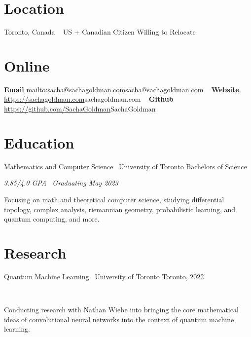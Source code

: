 \documentclass[]{style}
\begin{document}

\begin{aside} %
\section{Location}
Toronto, Canada
~ \vspace{-2mm}
US + Canadian Citizen 
Willing to Relocate
\section{Online}
\textbf{Email}
\url{mailto:sacha@sachagoldman.com}{sacha@sachagoldman.com} 
~ \vspace{-2mm}
\textbf{Website} 
\url{https://sachagoldman.com}{sachagoldman.com} 
~ \vspace{-2mm}
\textbf{Github}
\url{https://github.com/SachaGoldman}{SachaGoldman}
\end{aside}

\section{Education}

\begin{entrylist}

\entry
{Mathematics and Computer Science \ {\normalfont University of Toronto}}
{Bachelors of Science}
{\emph{3.85/4.0 GPA \ Graduating May 2023}
~ \vspace{1mm}

Focusing on math and theoretical computer science, studying differential topology, complex analysis, riemannian geometry, probabilistic learning, and quantum computing, and more.}

\end{entrylist}

\section{Research}

\begin{entrylist}

\vspace{1mm}

\entry
{Quantum Machine Learning \ {\normalfont University of Toronto}}
{Toronto, 2022}
{ ~ \vspace{-3.5mm}

Conducting research with Nathan Wiebe into bringing the core mathematical ideas of convolutional neural networks into the context of quantum machine learning.}

\end{entrylist}
\end{document}
